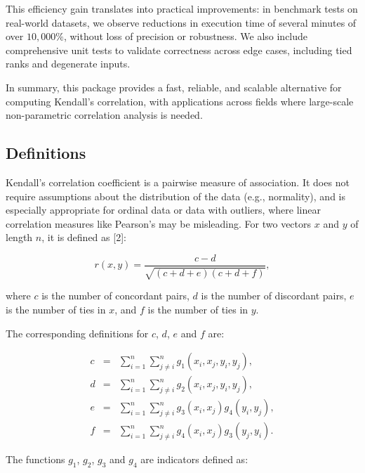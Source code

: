 \documentclass[
  10pt,
  letterpaper,
]{article}
\begin{document}
This efficiency gain translates into practical improvements: in
benchmark tests on real-world datasets, we observe reductions in
execution time of several minutes of over \(10,000\%\), without loss of
precision or robustness. We also include comprehensive unit tests to
validate correctness across edge cases, including tied ranks and
degenerate inputs.

In summary, this package provides a fast, reliable, and scalable
alternative for computing Kendall's correlation, with applications
across fields where large-scale non-parametric correlation analysis is
needed.

\subsection{Definitions}\label{definitions}

Kendall's correlation coefficient is a pairwise measure of association.
It does not require assumptions about the distribution of the data
(e.g., normality), and is especially appropriate for ordinal data or
data with outliers, where linear correlation measures like Pearson's may
be misleading. For two vectors \(x\) and \(y\) of length \(n\), it is
defined as {[}2{]}:

\begin{equation*}
r(x,y) = \frac{c - d}{\sqrt{(c + d + e)(c + d + f)}},
\end{equation*}

where \(c\) is the number of concordant pairs, \(d\) is the number of
discordant pairs, \(e\) is the number of ties in \(x\), and \(f\) is the
number of ties in \(y\).

The corresponding definitions for \(c\), \(d\), \(e\) and \(f\) are:

\begin{eqnarray*}
c &=& \sum_{i=1}^{n} \sum_{j \neq i}^{n} g_1(x_i, x_j, y_i, y_j), \\
d &=& \sum_{i=1}^{n} \sum_{j \neq i}^{n} g_2(x_i, x_j, y_i, y_j), \\ 
e &=& \sum_{i=1}^{n} \sum_{j \neq i}^{n} g_3(x_i, x_j) g_4(y_i, y_j), \\
f &=& \sum_{i=1}^{n} \sum_{j \neq i}^{n} g_4(x_i, x_j) g_3(y_j, y_i).
\end{eqnarray*}

The functions \(g_1\), \(g_2\), \(g_3\) and \(g_4\) are indicators
defined as:
\end{document}
